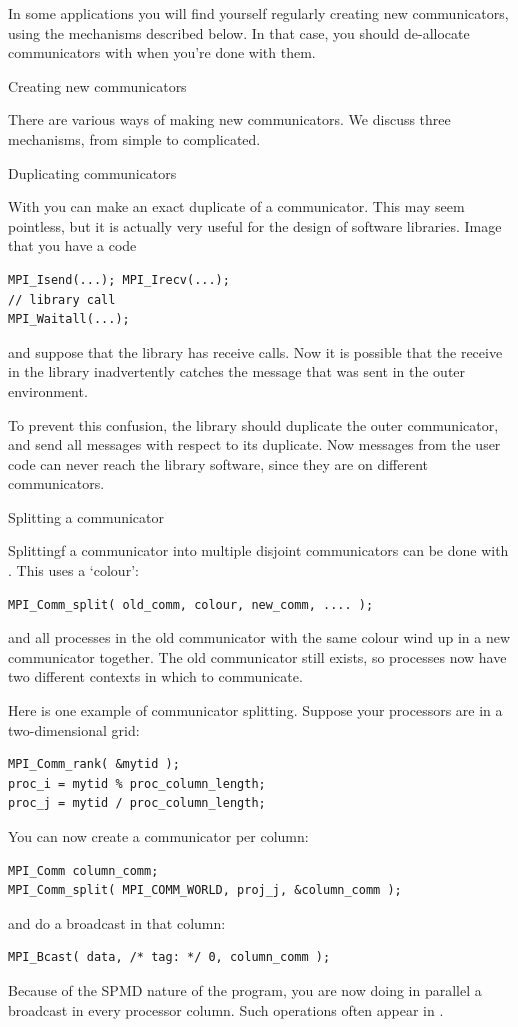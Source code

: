 In some applications you will find yourself regularly creating new
communicators, using the mechanisms described below. In that case, you
should de-allocate communicators with  when
you're done with them.

 {Creating new communicators}

There are various ways of making new communicators. We discuss three 
mechanisms, from simple to complicated.

 {Duplicating communicators}

With  you can make an exact duplicate of a communicator.
This may seem pointless, but it is actually very useful for the design of
software libraries. Image that you have a code
\begin{verbatim}
MPI_Isend(...); MPI_Irecv(...);
// library call
MPI_Waitall(...);
\end{verbatim}
and suppose that the library has receive calls. Now it is possible that the 
receive in the library inadvertently
catches the message that was sent in the outer environment.

To prevent this confusion, the library should duplicate the outer communicator,
and send all messages with respect to its duplicate. Now messages from the user
code can never reach the library software, since they are on different communicators.

 {Splitting a communicator}

Splittingf a communicator into multiple disjoint communicators
can be done with .
This uses a `colour':
\begin{verbatim}
MPI_Comm_split( old_comm, colour, new_comm, .... );
\end{verbatim}
  and all processes in the old communicator with the same colour
  wind up in a new communicator together. The old communicator still exists,
  so processes now have two different contexts in which to communicate.

Here is one example of communicator splitting. Suppose your processors
are in a two-dimensional grid:
\begin{verbatim}
MPI_Comm_rank( &mytid );
proc_i = mytid % proc_column_length;
proc_j = mytid / proc_column_length;
\end{verbatim}
You can now create a communicator per column:
\begin{verbatim}
MPI_Comm column_comm;
MPI_Comm_split( MPI_COMM_WORLD, proj_j, &column_comm );
\end{verbatim}
and do a broadcast in that column:
\begin{verbatim}
MPI_Bcast( data, /* tag: */ 0, column_comm );
\end{verbatim}
Because of the SPMD nature of the program, you are now doing in parallel
a broadcast in every processor column. Such operations often appear
in .

